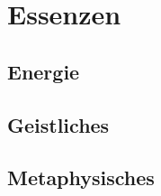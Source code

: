 \documentclass[a4paper,12pt,oneside]{book}
\begin{document}
\part{Essenzen}

\chapter{Energie}
\begin{description}

\end{description}

\chapter{Geistliches}

\chapter{Metaphysisches}
\end{document}
